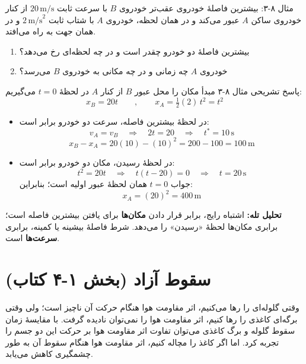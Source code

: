 \documentclass[12pt, a4paper]{article}
\begin{document}
\begin{exambox}{مثال ۸-۳: بیشترین فاصلهٔ خودروی عقب‌تر}
خودروی $B$ با سرعت ثابت $20\,\text{m/s}$ از کنار خودروی ساکن $A$ عبور می‌کند و در همان لحظه، خودروی $A$ با شتاب ثابت $2\,\text{m/s}^2$ و در همان جهت به راه می‌افتد.
\begin{enumerate}
    \item[الف)] بیشترین فاصلهٔ دو خودرو چقدر است و در چه لحظه‌ای رخ می‌دهد؟
    \item[ب)] خودروی $A$ چه زمانی و در چه مکانی به خودروی $B$ می‌رسد؟
\end{enumerate}
\end{exambox}

\begin{answerbox}{پاسخ تشریحی مثال ۸-۳}
مبدأ مکان را محل عبور $B$ از کنار $A$ در لحظهٔ $t=0$ می‌گیریم:
\[
x_B = 20t
\qquad , \qquad
x_A = \tfrac{1}{2}(2)\,t^2 = t^2
\]

\begin{itemize}
    \item[الف)] در لحظهٔ بیشترین فاصله، سرعت دو خودرو برابر است:
    \[
    v_A = v_B \quad \Longrightarrow \quad 2t = 20 \quad \Longrightarrow \quad t^* = 10\,\text{s}
    \]
    \[
    x_B - x_A = 20(10) - (10)^2 = 200 - 100 = 100\,\text{m}
    \]

    \item[ب)] در لحظهٔ رسیدن، مکان دو خودرو برابر است:
    \[
    t^2 = 20t \quad \Longrightarrow \quad t(t-20) = 0 \quad \Longrightarrow \quad t = 20\,\text{s}
    \]
    جواب $t=0$ همان لحظهٔ عبور اولیه است؛ بنابراین:
    \[
    x_A = (20)^2 = 400\,\text{m}
    \]
\end{itemize}

\textbf{تحلیل تله:} اشتباه رایج، برابر قرار دادن \textbf{مکان‌ها} برای یافتن بیشترین فاصله است؛ برابری مکان‌ها لحظهٔ «رسیدن» را می‌دهد. شرط فاصلهٔ بیشینه یا کمینه، برابری \textbf{سرعت‌ها} است.
\end{answerbox}

\section{سقوط آزاد (بخش ۱-۴ کتاب)}

وقتی گلوله‌ای را رها می‌کنیم، اثر مقاومت هوا هنگام حرکت آن ناچیز است؛ ولی وقتی برگه‌ای کاغذی را رها کنیم، اثر مقاومت هوا را نمی‌توان نادیده گرفت. با مقایسهٔ زمان سقوط گلوله و برگ کاغذی می‌توان تفاوت اثر مقاومت هوا بر حرکت این دو جسم را تجربه کرد. اما اگر کاغذ را مچاله کنیم، اثر مقاومت هوا هنگام سقوط آن به طور چشمگیری کاهش می‌یابد.
\end{document}
